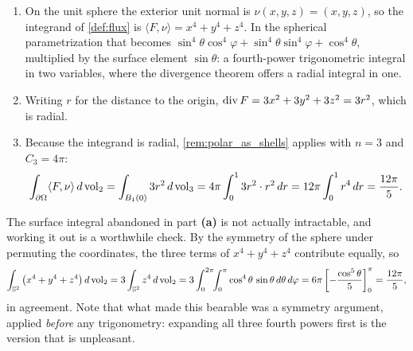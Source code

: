 
\begin{exercisesolution}
\label{sol:ai_flux_cubic_sphere}
\begin{enumerate}[label=\textbf{(\alph*)}]
  \item On the unit sphere the exterior unit normal is $\nu(x,y,z) = (x,y,z)$, so the
    integrand of \cref{def:flux} is $\langle F,\nu\rangle = x^4+y^4+z^4$. In the spherical
    parametrization that becomes
    $\sin^4\theta\cos^4\varphi + \sin^4\theta\sin^4\varphi + \cos^4\theta$, multiplied by the
    surface element $\sin\theta$: a fourth-power trigonometric integral in two variables, where
    the divergence theorem offers a radial integral in one.
  \item Writing $r$ for the distance to the origin,
    $\operatorname{div} F = 3x^2+3y^2+3z^2 = 3r^2$, which is radial.
  \item Because the integrand is radial, \cref{rem:polar_as_shells} applies with $n = 3$ and
    $C_3 = 4\pi$:
    \[\int_{\partial\Omega}\langle F,\nu\rangle\,d\operatorname{vol}_2 = \int_{B_1(0)} 3r^2\,d\operatorname{vol}_3
      = 4\pi\int_0^1 3r^2\cdot r^2\,dr = 12\pi\int_0^1 r^4\,dr = \frac{12\pi}{5}.\]
\end{enumerate}

\begin{remark}
\label{rem:cubic_flux_direct_check}
The surface integral abandoned in part \textbf{(a)} is not actually intractable, and working it
out is a
worthwhile check. By the symmetry of the sphere under permuting the coordinates, the three terms
of $x^4+y^4+z^4$ contribute equally, so
\[\int_{\mathbb{S}^2}\big(x^4+y^4+z^4\big)\,d\operatorname{vol}_2 = 3\int_{\mathbb{S}^2} z^4\,d\operatorname{vol}_2
  = 3\int_0^{2\pi}\!\!\int_0^\pi \cos^4\theta\,\sin\theta\,d\theta\,d\varphi
  = 6\pi\left[-\frac{\cos^5\theta}{5}\right]_0^\pi = \frac{12\pi}{5},\]
in agreement. Note that what made this bearable was a symmetry argument, applied \emph{before}
any trigonometry: expanding all three fourth powers first is the version that is unpleasant.
\end{remark}
\end{exercisesolution}

